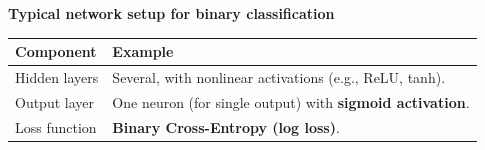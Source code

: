 \highspace
\begin{flushleft}
    \textcolor{Green3}{ \textbf{Typical network setup for binary classification}}
\end{flushleft}

\begin{table}[!htp]
    \centering
    \begin{tabular}{@{} l p{25em} @{}}
        \toprule
        \textbf{Component} & \textbf{Example} \\
        \midrule
        Hidden layers   & Several, with nonlinear activations (e.g., ReLU, tanh). \\[.3em]
        Output layer    & One neuron (for single output) with \textbf{sigmoid activation}. \\[.3em]
        Loss function   & \textbf{Binary Cross-Entropy (log loss)}. \\
        \bottomrule
    \end{tabular}
\end{table}

